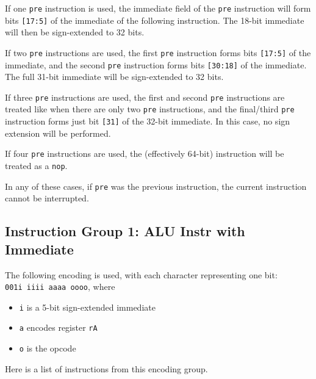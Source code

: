 \documentclass{article}
\begin{document}
	If one \texttt{pre} instruction is used, the immediate field of the
	\texttt{pre} instruction will form bits \texttt{[17:5]} of the
	immediate of the following instruction.  The 18-bit immediate will then
	be sign-extended to 32 bits.

	If two \texttt{pre} instructions are used, the first \texttt{pre}
	instruction forms bits \texttt{[17:5]} of the immediate, and the second
	\texttt{pre} instruction forms bits \texttt{[30:18]} of the immediate.
	The full 31-bit immediate will be sign-extended to 32 bits.

	If three \texttt{pre} instructions are used, the first and second
	\texttt{pre} instructions are treated like when there are only two
	\texttt{pre} instructions, and the final/third \texttt{pre} instruction
	forms just bit \texttt{[31]} of the 32-bit immediate.  In this case, no
	sign extension will be performed.

	If four \texttt{pre} instructions are used, the (effectively 64-bit)
	instruction will be treated as a \texttt{nop}.

	In any of these cases, if \texttt{pre} was the previous instruction,
	the current instruction cannot be interrupted.


	\subsection{Instruction Group 1:  ALU Instr with Immediate}
	The following encoding is used, with each character representing one
	bit:  \\
	\texttt{001i iiii aaaa oooo}, where

	\singlespacing
	\begin{itemize}
		\item \texttt{i} is a 5-bit sign-extended immediate
		\item \texttt{a} encodes register \texttt{rA}
		\item \texttt{o} is the opcode
	\end{itemize}
	\doublespacing

	Here is a list of instructions from this encoding group.
\end{document}
